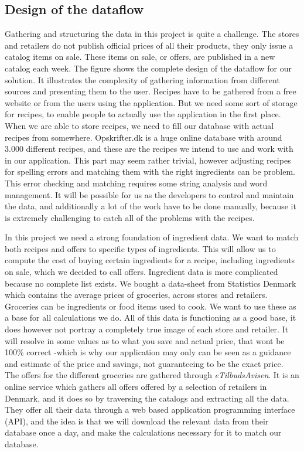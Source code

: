 \subsection{Design of the dataflow}\label{subsec:dataflow}

Gathering and structuring the data in this project is quite a challenge. The stores and retailers do not publish official prices of all their products, they only issue a catalog items on sale. These items on sale, or offers, are published in a new catalog each week. The figure  shows the complete design of the dataflow for our solution. It illustrates the complexity of gathering information from different sources and presenting them to the user. Recipes have to be gathered from a free website or from the users using the application. But we need some sort of storage for recipes, to enable people to actually use the application in the first place. When we are able to store recipes, we need to fill our database with actual recipes from somewhere. Opskrifter.dk is a huge online database with around 3.000 different recipes, and these are the recipes we intend to use and work with in our application. This part may seem rather trivial, however adjusting recipes for spelling errors and matching them with the right ingredients can be problem. This error checking and matching requires some string analysis and word management. It will be possible for us as the developers to control and maintain the data, and additionally a lot of the work have to be done manually, because it is extremely challenging to catch all of the problems with the recipes.

In this project we need a strong foundation of ingredient data. We want to match both recipes and offers to specific types of ingredients. This will allow us to compute the cost of buying certain ingredients for a recipe, including ingredients on sale, which we decided to call offers. Ingredient data is more complicated because no complete list exists. We bought a data-sheet from Statistics Denmark which contains the average prices of groceries, across stores and retailers. Groceries can be ingredients or food items used to cook. We want to use these as a base for all calculations we do. All of this data is functioning as a good base, it does however not portray a completely true image of each store and retailer. It will resolve in some values as to what you save and actual price, that wont be 100\% correct -which is why our application may only can be seen as a guidance and estimate of the price and savings, not guaranteeing to be the exact price. The offers for the different groceries are gathered through \textit{eTilbudsAvisen}. It is an online service which gathers all offers offered by a selection of retailers in Denmark, and it does so by traversing the catalogs and extracting all the data. They offer all their data through a web based application programming interface (API), and the idea is that we will download the relevant data from their database once a day, and make the calculations necessary for it to match our database. 

